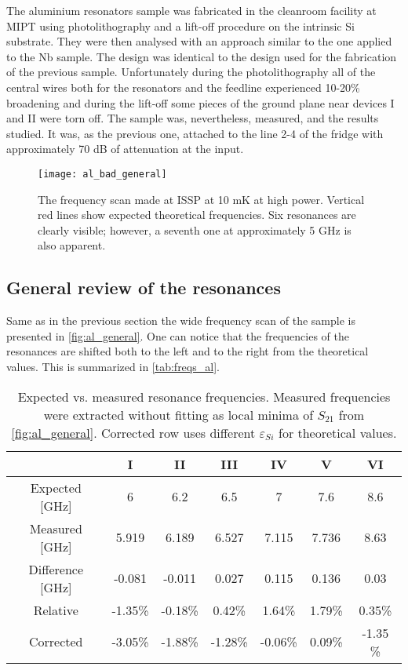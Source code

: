 \documentclass[12pt]{article}
\numberwithin{equation}{section}
\numberwithin{figure}{section}
\begin{document}
The aluminium resonators sample was fabricated in the cleanroom facility at MIPT using photolithography and a lift-off procedure on the intrinsic Si substrate. They were then analysed with an approach similar to the one applied to the Nb sample. The design was identical to the design used for the fabrication of the previous sample. Unfortunately during the photolithography all of the central wires both for the resonators and the feedline experienced 10-20\% broadening and during the lift-off some pieces of the ground plane near devices I and II were torn off. The sample was, nevertheless, measured, and the results studied.
It was, as the previous one, attached to the line 2-4 of the fridge with approximately 70 dB of attenuation at the input.

\begin{figure}[h]
\centering
\texttt{[image: al\_bad\_general]}
\caption{The frequency scan made at ISSP at 10 mK at high power. Vertical red lines show expected theoretical frequencies. Six resonances are clearly visible; however, a seventh one at approximately 5 GHz is also apparent.}
\label{fig:al_general}
\end{figure}

\subsection{General review of the resonances}

Same as in the previous section the wide frequency scan of the sample is presented in \autoref{fig:al_general}. One can notice that the frequencies of the resonances are shifted  both to the left and to the right from the theoretical values. This is summarized in \autoref{tab:freqs_al}.

\begin{table}
\centering
\bgroup
\def\arraystretch{1.5}%
\begin{tabular}{c|*{6}{c}}
  & I & II & III & IV & V & VI\\
\hline
Expected [GHz]& 6 & 6.2 & 6.5 & 7 & 7.6 & 8.6 \\
Measured [GHz] & 5.919 & 6.189 & 6.527 & 7.115 & 7.736 & 8.63 \\
Difference [GHz]&  -0.081 & -0.011 &  0.027 &  0.115 &  0.136 &  0.03 \\
Relative & -1.35\% & -0.18\% &  0.42\% &  1.64\% &  1.79\% &  0.35\%\\
Corrected & -3.05\% & -1.88\% & -1.28\% & -0.06\% &  0.09\% & -1.35 \%
\end{tabular}
\egroup
\caption{Expected vs. measured resonance frequencies. Measured frequencies were extracted without fitting as local minima of $S_{21}$ from \autoref{fig:al_general}. Corrected row uses different $\varepsilon_{Si}$ for theoretical values.}
\label{tab:freqs_al}
\end{table}
\end{document}
